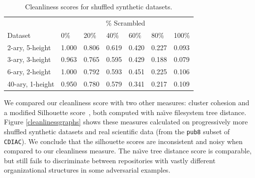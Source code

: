 \documentclass[sigconf,screen]{acmart}
\begin{document}
\begin {table}[!htbp]
\begin{center}
\begin{tabular}{@{}lllllll@{}}  %
\toprule
  & \multicolumn{6}{c}{\% Scrambled} \\
 Dataset & 0\% & 20\% & 40\% & 60\% & 80\% & 100\%\\
\midrule
 2-ary, \hspace{0.5mm} 5-height & 1.000 & 0.806 & 0.619 & 0.420 & 0.227 & 0.093\\ 
 3-ary, \hspace{0.5mm} 3-height & 0.963 & 0.765 & 0.595 & 0.429 & 0.188 & 0.079\\ 
 6-ary, \hspace{0.5mm} 2-height & 1.000 & 0.792 & 0.593 & 0.451 & 0.225 & 0.106\\ 
 40-ary, 1-height & 0.950 & 0.780 & 0.579 & 0.341 & 0.217 & 0.109\\ 
 \bottomrule
\end{tabular}
\caption{\label{synthetictable} Cleanliness scores for shuffled synthetic datasets.}
\end{center}
\vspace{-1.0cm}
\end{table}


We compared our cleanliness score with two other measures: cluster cohesion and a modified Silhouette score~\cite{silhouette}, both computed with na{\"{\i}}ve filesystem tree distance. 
Figure \ref{cleanlinessgraphs} shows these measures calculated on progressively more shuffled synthetic datasets and real scientific data (from the \texttt{pub8} subset of \texttt{CDIAC}). We conclude that the silhouette scores are inconsistent and noisy when compared to our cleanliness measure. The na{\"{\i}}ve tree distance score is comparable, but still fails to discriminate between repositories with vastly different organizational structures in some adversarial examples.
\end{document}
